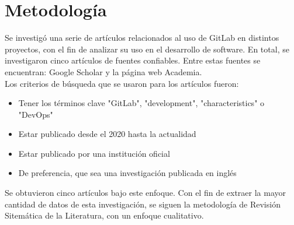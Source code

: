 \documentclass[runningheads]{llncs}
\begin{document}
\section{Metodología}
Se investigó una serie de artículos relacionados al uso de GitLab en distintos proyectos, con el fin
de analizar su uso en el desarrollo de software. En total, se investigaron cinco artículos de fuentes confiables.
Entre estas fuentes se encuentran: Google Scholar y la página web Academia.\\
Los criterios de búsqueda que se usaron para los artículos fueron:
\begin{itemize}
        \item Tener los términos clave "GitLab", "development", "characteristics" o "DevOps"
        \item Estar publicado desde el 2020 hasta la actualidad
        \item Estar publicado por una institución oficial
        \item De preferencia, que sea una investigación publicada en inglés
\end{itemize}
Se obtuvieron cinco artículos bajo este enfoque. Con el fin de extraer la mayor cantidad de datos de
esta investigación, se siguen la metodología de Revisión Sitemática de la Literatura, con un enfoque
cualitativo.
\end{document}
